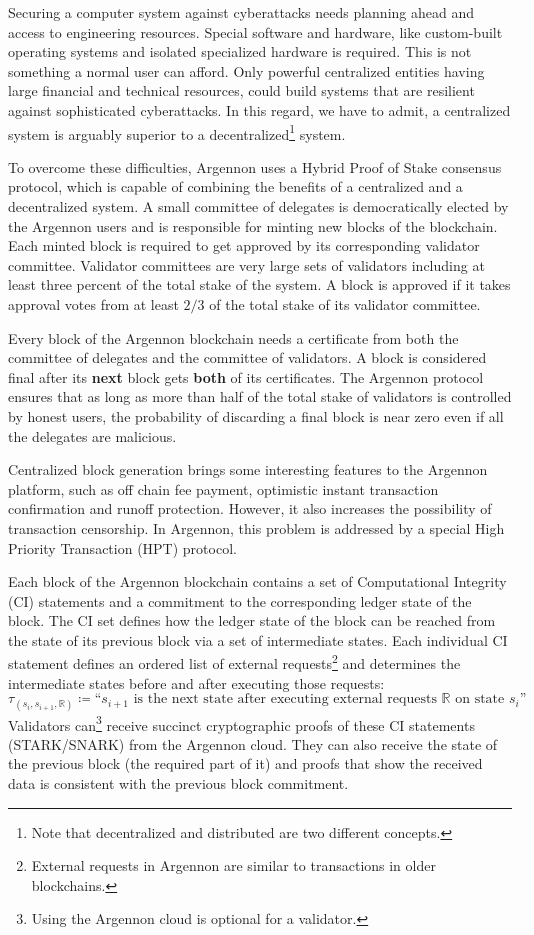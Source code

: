 Securing a computer system against cyberattacks needs planning ahead and access to engineering resources.
Special software and hardware, like custom-built operating systems and isolated specialized hardware is required.
This is not something a normal user can afford. Only powerful centralized entities having large financial and
technical resources, could build
systems that are resilient against sophisticated cyberattacks. In this regard, we have to admit, a centralized system is
arguably superior to a decentralized\footnote{Note that decentralized and distributed are two different concepts.}
system.

To overcome these difficulties, Argennon uses a Hybrid Proof of Stake consensus protocol, which is
capable of combining the benefits of a centralized and a decentralized system. A small committee of
delegates is democratically elected
by the Argennon users and is responsible for minting new blocks of the blockchain. Each
minted block is required to get approved by its corresponding validator committee. Validator committees are very
large sets of validators including at least three percent of the total stake of the system. A block is approved if it
takes approval votes from at least \(2/3\) of the total stake of its validator committee.

Every block of the Argennon blockchain needs a certificate from both the committee of delegates and
the committee of validators. A block is considered final after its \textbf{next} block gets \textbf{both} of
its certificates. The Argennon protocol ensures that as long as more than half of the total stake of validators is
controlled by honest users, the probability of discarding a final block is near zero even if all the delegates are
malicious.

Centralized block generation brings some interesting features to the Argennon platform, such as off
chain fee payment, optimistic instant transaction confirmation and runoff protection. However, it also increases
the possibility of transaction censorship. In Argennon, this problem is addressed by a special
High Priority Transaction (HPT) protocol.

Each block of the Argennon blockchain contains a set of Computational Integrity (CI) statements and a commitment to
the corresponding ledger state of the block. The CI set defines how
the ledger state of the block can be reached from the state of its previous block via a set of intermediate states.
Each individual CI statement defines an ordered list of external requests\footnote{External requests in Argennon are
similar to transactions in older blockchains.} and determines the intermediate states before and after executing those
requests:
\[
    \tau_{(s_i,s_{i+1},\mathbb{R})} \coloneqq \text{``$s_{i+1}$ is the next state after executing external requests
        $\mathbb{R}$ on state $s_i$''}
\]
Validators can\footnote{Using the Argennon cloud is optional for a validator.} receive succinct cryptographic proofs
of these CI statements (STARK/SNARK) from the Argennon cloud. They can also receive the state of the previous
block (the required part of it) and proofs that show the received data is consistent with the previous block commitment.

